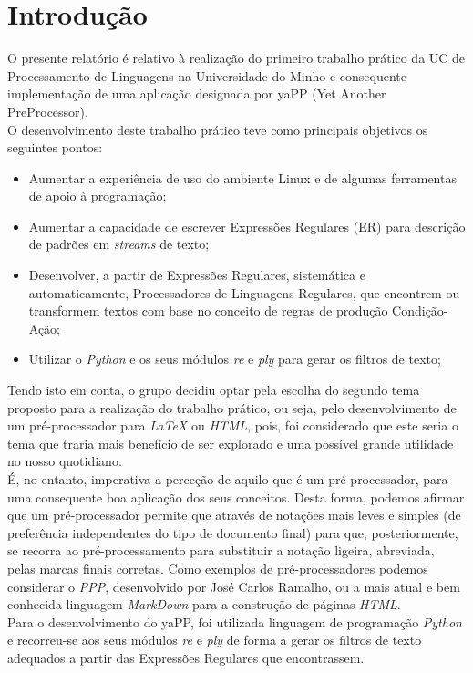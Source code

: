 \documentclass{article}
\begin{document}
\section{Introdução}
O presente relatório é relativo à realização do primeiro trabalho prático da UC de Processamento de Linguagens na Universidade do Minho e consequente implementação de uma aplicação designada por yaPP (Yet Another PreProcessor).\\
 O desenvolvimento deste trabalho prático teve como principais objetivos os seguintes pontos: 
\begin{itemize}
\item Aumentar a experiência de uso do ambiente Linux e de algumas ferramentas de apoio à programação;
\item Aumentar a capacidade de escrever Expressões Regulares (ER) para descrição de padrões em \textit{streams} de texto;
\item Desenvolver, a partir de Expressões Regulares, sistemática e automaticamente, Processadores de Linguagens Regulares, que encontrem ou transformem textos com base no conceito de regras de produção Condição-Ação;
\item Utilizar o \textit{Python} e os seus módulos \textit{re} e \textit{ply} para gerar os filtros de texto;
\end{itemize}
 Tendo isto em conta, o grupo decidiu optar pela escolha do segundo tema proposto para a realização do trabalho prático, ou seja, pelo desenvolvimento de um pré-processador para \textit{LaTeX} ou \textit{HTML}, pois, foi considerado que este seria o tema que traria mais benefício de ser explorado e uma possível grande utilidade no nosso quotidiano.\\
 É, no entanto, imperativa a perceção de aquilo que é um pré-processador, para uma consequente boa aplicação dos seus conceitos. Desta forma, podemos afirmar que um pré-processador permite que através de notações mais leves e simples (de preferência independentes do tipo de documento final) para que, posteriormente, se recorra ao pré-processamento para substituir a notação ligeira, abreviada, pelas marcas finais corretas. Como exemplos de pré-processadores podemos considerar o \textit{PPP}, desenvolvido por José Carlos Ramalho, ou a mais atual e bem conhecida linguagem \textit{MarkDown} para a construção de páginas \textit{HTML}.\\
 Para o desenvolvimento do yaPP, foi utilizada linguagem de programação \textit{Python} e recorreu-se aos seus módulos \textit{re} e \textit{ply} de forma a gerar os filtros de texto adequados a partir das Expressões Regulares que encontrassem.\\
\end{document}
